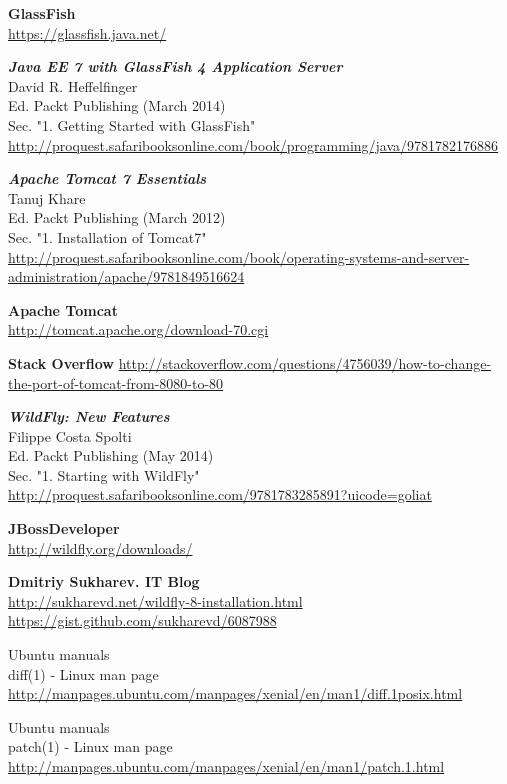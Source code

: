 \begin{thebibliography}{10}
\textbf{GlassFish}\\
  \url{https://glassfish.java.net/}

\textbf{\textit{Java EE 7 with GlassFish 4 Application Server}}\\
David R. Heffelfinger\\
Ed. Packt Publishing (March 2014)\\
Sec. "1. Getting Started with GlassFish"\\
  \url{http://proquest.safaribooksonline.com/book/programming/java/9781782176886}

\textbf{\textit{Apache Tomcat 7 Essentials}}\\
Tanuj Khare\\
Ed. Packt Publishing (March 2012)\\
Sec. "1. Installation of Tomcat7"\\
  \url{http://proquest.safaribooksonline.com/book/operating-systems-and-server-administration/apache/9781849516624}

\textbf{Apache Tomcat}\\
  \url{http://tomcat.apache.org/download-70.cgi}

\textbf{Stack Overflow}
  \url{http://stackoverflow.com/questions/4756039/how-to-change-the-port-of-tomcat-from-8080-to-80}

\textbf{\textit{WildFly: New Features}}\\
Filippe Costa Spolti\\
Ed. Packt Publishing (May 2014)\\
Sec. "1. Starting with WildFly"\\
  \url{http://proquest.safaribooksonline.com/9781783285891?uicode=goliat} 

\textbf{JBossDeveloper}\\
  \url{http://wildfly.org/downloads/}

\textbf{Dmitriy Sukharev. IT Blog}\\
  \url{http://sukharevd.net/wildfly-8-installation.html}
  \url{https://gist.github.com/sukharevd/6087988}

Ubuntu manuals\\
diff(1) - Linux man page\\
  \url{http://manpages.ubuntu.com/manpages/xenial/en/man1/diff.1posix.html}

Ubuntu manuals\\
patch(1) - Linux man page\\
  \url{http://manpages.ubuntu.com/manpages/xenial/en/man1/patch.1.html}


\end{thebibliography}
